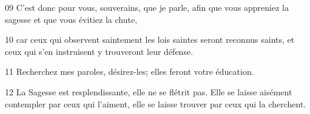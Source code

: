 09 C’est donc pour vous, souverains, que je parle, afin que vous appreniez la sagesse et que vous évitiez la chute,

10 car ceux qui observent saintement les lois saintes seront reconnus saints, et ceux qui s’en instruisent y trouveront leur défense.

11 Recherchez mes paroles, désirez-les; elles feront votre éducation.

12 La Sagesse est resplendissante, elle ne se flétrit pas. Elle se laisse aisément contempler par ceux qui l’aiment, elle se laisse trouver par ceux qui la cherchent.
